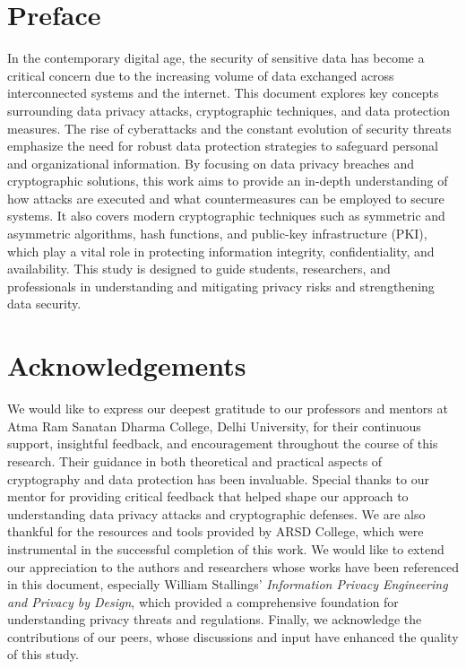 \section*{Preface}
In the contemporary digital age, the security of sensitive data has become a critical concern due to the increasing volume of data exchanged across interconnected systems and the internet. This document explores key concepts surrounding data privacy attacks, cryptographic techniques, and data protection measures. The rise of cyberattacks and the constant evolution of security threats emphasize the need for robust data protection strategies to safeguard personal and organizational information. By focusing on data privacy breaches and cryptographic solutions, this work aims to provide an in-depth understanding of how attacks are executed and what countermeasures can be employed to secure systems. It also covers modern cryptographic techniques such as symmetric and asymmetric algorithms, hash functions, and public-key infrastructure (PKI), which play a vital role in protecting information integrity, confidentiality, and availability. This study is designed to guide students, researchers, and professionals in understanding and mitigating privacy risks and strengthening data security.

\newpage
\section*{Acknowledgements}
We would like to express our deepest gratitude to our professors and mentors at Atma Ram Sanatan Dharma College, Delhi University, for their continuous support, insightful feedback, and encouragement throughout the course of this research. Their guidance in both theoretical and practical aspects of cryptography and data protection has been invaluable. Special thanks to our mentor for providing critical feedback that helped shape our approach to understanding data privacy attacks and cryptographic defenses. We are also thankful for the resources and tools provided by ARSD College, which were instrumental in the successful completion of this work. We would like to extend our appreciation to the authors and researchers whose works have been referenced in this document, especially William Stallings' \textit{Information Privacy Engineering and Privacy by Design}, which provided a comprehensive foundation for understanding privacy threats and regulations. Finally, we acknowledge the contributions of our peers, whose discussions and input have enhanced the quality of this study.



